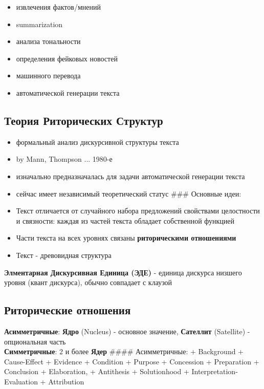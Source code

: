 \documentclass[11pt]{article}
\providecommand{\tightlist}{%
      \setlength{\itemsep}{0pt}\setlength{\parskip}{0pt}}
\begin{document}
\begin{itemize}
\tightlist
\item
  извлечения фактов/мнений
\item
  summarization
\item
  анализа тональности
\item
  определения фейковых новостей
\item
  машинного перевода
\item
  автоматической генерации текста
\end{itemize}

    \subsection{Теория Риторических
Структур}\label{ux442ux435ux43eux440ux438ux44f-ux440ux438ux442ux43eux440ux438ux447ux435ux441ux43aux438ux445-ux441ux442ux440ux443ux43aux442ux443ux440}

\begin{itemize}
\tightlist
\item
  формальный анализ дискурсивной структуры текста
\item
  by Mann, Thompson ... 1980-е
\item
  изначально предназначалась для задачи автоматической генерации текста
\item
  сейчас имеет независимый теоретический статус \#\#\# Основные идеи:
\item
  Текст отличается от случайного набора предложений свойствами
  целостности и связности: каждая из частей текста обладает собственной
  функцией
\item
  Части текста на всех уровнях связаны \textbf{риторическими
  отношениями}
\item
  Текст - древовидная структура
\end{itemize}

    \textbf{Элментарная Дискурсивная Единица (ЭДЕ)} - единица дискурса
низшего уровня (квант дискурса), обычно совпадает с клаузой

    \subsection{Риторические
отношения}\label{ux440ux438ux442ux43eux440ux438ux447ux435ux441ux43aux438ux435-ux43eux442ux43dux43eux448ux435ux43dux438ux44f}

\textbf{Асимметричные}: \textbf{Ядро} (Nucleus) - основное значение,
\textbf{Сателлит} (Satellite) - опциональная часть\\
\textbf{Симметричные}: 2 и более \textbf{Ядер} \#\#\#\# Асимметричные: +
Background + Cause-Effect + Evidence + Condition + Purpose + Concession
+ Preparation + Conclusion + Elaboration, + Antithesis + Solutionhood +
Interpretation-Evaluation + Attribution
\end{document}
